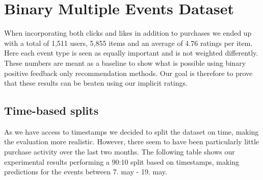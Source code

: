 \section{Binary Multiple Events Dataset}

When incorporating both clicks and likes in addition to purchases we ended up with a total of 1,511 users, 5,855 items
and an average of 4.76 ratings per item. Here each event type is seen as equally important and is not weighted differently.
These numbers are meant as a baseline to show what is possible using binary positive feedback only recommendation methods.
Our goal is therefore to prove that these results can be beaten using our implicit ratings.

\subsection{Time-based splits}

As we have access to timestamps we decided to split the dataset on time, making the evaluation more realistic. However,
there seem to have been particularly little purchase activity over the last two months. The following table shows our
experimental results performing a 90:10 split based on timestamps, making predictions for the events between 7. may -
19. may.

\begin{table}[H]
\centering
{}
\caption{Experimental results time-based splits 90:10 (7. May - 19. May)}
\end{table}

